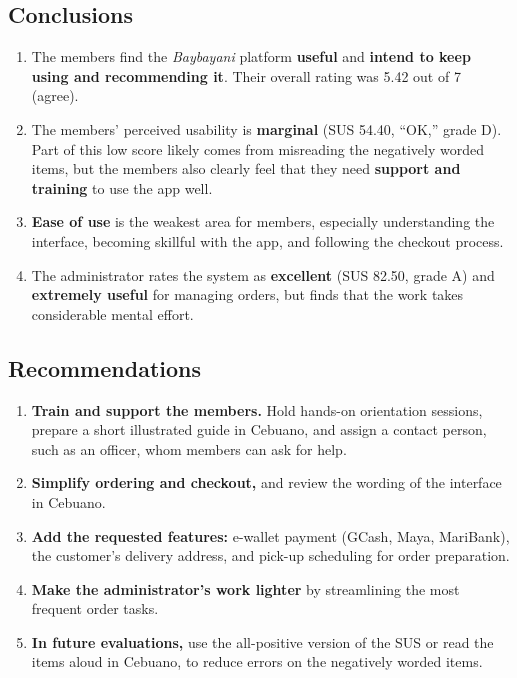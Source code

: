 \documentclass[11pt,a4paper]{article}
\begin{document}
\subsection{Conclusions}
\begin{enumerate}
  \item The members find the \textit{Baybayani} platform \textbf{useful} and \textbf{intend to keep using and recommending it}. Their overall rating was 5.42 out of 7 (agree).
  \item The members' perceived usability is \textbf{marginal} (SUS 54.40, ``OK,'' grade D). Part of this low score likely comes from misreading the negatively worded items, but the members also clearly feel that they need \textbf{support and training} to use the app well.
  \item \textbf{Ease of use} is the weakest area for members, especially understanding the interface, becoming skillful with the app, and following the checkout process.
  \item The administrator rates the system as \textbf{excellent} (SUS 82.50, grade A) and \textbf{extremely useful} for managing orders, but finds that the work takes considerable mental effort.
\end{enumerate}

\subsection{Recommendations}
\begin{enumerate}
  \item \textbf{Train and support the members.} Hold hands-on orientation sessions, prepare a short illustrated guide in Cebuano, and assign a contact person, such as an officer, whom members can ask for help.
  \item \textbf{Simplify ordering and checkout,} and review the wording of the interface in Cebuano.
  \item \textbf{Add the requested features:} e-wallet payment (GCash, Maya, MariBank), the customer's delivery address, and pick-up scheduling for order preparation.
  \item \textbf{Make the administrator's work lighter} by streamlining the most frequent order tasks.
  \item \textbf{In future evaluations,} use the all-positive version of the SUS \citep{sauro2011} or read the items aloud in Cebuano, to reduce errors on the negatively worded items.
\end{enumerate}
\end{document}

